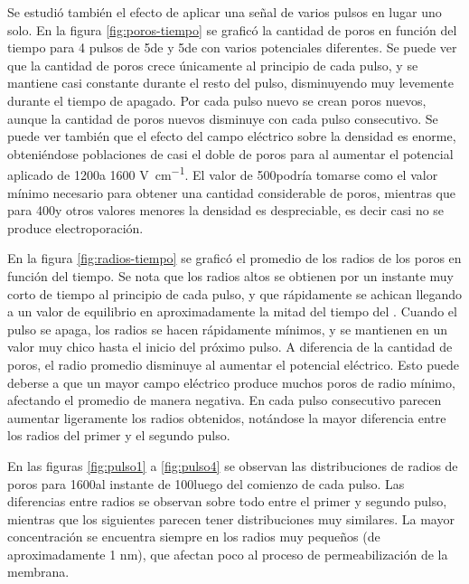 
Se estudió también el efecto de aplicar una señal de varios pulsos en lugar uno solo. En la figura \ref{fig:poros-tiempo} se graficó la cantidad de poros en función del tiempo para 4 pulsos de 5\ms de \ontime{} y 5\ms de \offtime{} con varios potenciales diferentes. Se puede ver que la cantidad de poros crece únicamente al principio de cada pulso, y se mantiene casi constante durante el resto del pulso, disminuyendo muy levemente durante el tiempo de apagado. Por cada pulso nuevo se crean poros nuevos, aunque la cantidad de poros nuevos disminuye con cada pulso consecutivo. Se puede ver también que el efecto del campo eléctrico sobre la densidad es enorme, obteniéndose poblaciones de casi el doble de poros para al aumentar el potencial aplicado de 1200\vcm a 1600 \si{\volt\per\centi\metre}. El valor de 500\vcm podría tomarse como el valor mínimo necesario para obtener una cantidad considerable de poros, mientras que para 400\vcm y otros valores menores la densidad es despreciable, es decir casi no se produce electroporación. 

En la figura \ref{fig:radios-tiempo} se graficó el promedio de los radios de los poros en función del tiempo. Se nota que los radios altos se obtienen por un instante muy corto de tiempo al principio de cada pulso, y que rápidamente se achican llegando a un valor de equilibrio en aproximadamente la mitad del tiempo del \ontime. Cuando el pulso se apaga, los radios se hacen rápidamente mínimos, y se mantienen en un valor muy chico hasta el inicio del próximo pulso. A diferencia de la cantidad de poros, el radio promedio disminuye al aumentar el potencial eléctrico. Esto puede deberse a que un mayor campo eléctrico produce muchos poros de radio mínimo, afectando el promedio de manera negativa. En cada pulso consecutivo parecen aumentar ligeramente los radios obtenidos, notándose la mayor diferencia entre los radios del primer y el segundo pulso. 

En las figuras \ref{fig:pulso1} a \ref{fig:pulso4} se observan las distribuciones de radios de poros para 1600\vcm al instante de 100\usec luego del comienzo de cada pulso. Las diferencias entre radios se observan sobre todo entre el primer y segundo pulso, mientras que los siguientes parecen tener distribuciones muy similares. La mayor concentración se encuentra siempre en los radios muy pequeños (de aproximadamente 1 \si{\nano\metre}), que afectan poco al proceso de permeabilización de la membrana.



